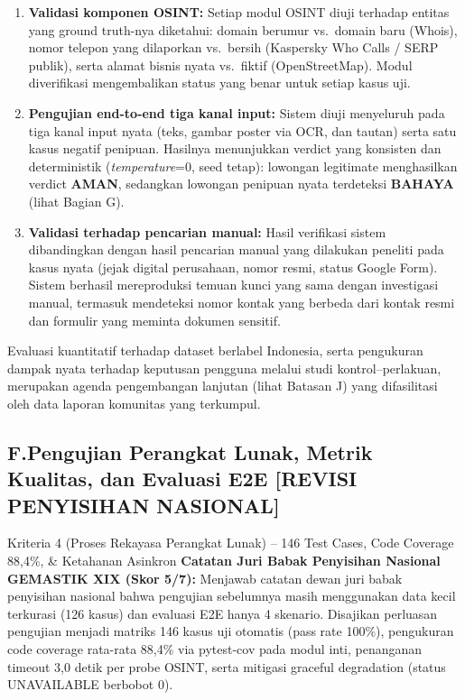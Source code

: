 \documentclass[12pt,a4paper]{article}
\begin{document}
\begin{enumerate}[label=\textbf{\arabic*.}]
\item \textbf{Validasi komponen OSINT:} Setiap modul OSINT diuji terhadap entitas yang ground
truth-nya diketahui: domain berumur vs.\ domain baru (Whois), nomor telepon yang dilaporkan vs.\
bersih (Kaspersky Who Calls / SERP publik), serta alamat bisnis nyata vs.\ fiktif (OpenStreetMap).
Modul diverifikasi mengembalikan status yang benar untuk setiap kasus uji.

\item \textbf{Pengujian end-to-end tiga kanal input:} Sistem diuji menyeluruh pada tiga kanal input
nyata (teks, gambar poster via OCR, dan tautan) serta satu kasus negatif penipuan. Hasilnya
menunjukkan verdict yang konsisten dan deterministik (\textit{temperature}=0, seed tetap):
lowongan legitimate menghasilkan verdict \textbf{AMAN}, sedangkan lowongan penipuan nyata
terdeteksi \textbf{BAHAYA} (lihat Bagian G).

\item \textbf{Validasi terhadap pencarian manual:} Hasil verifikasi sistem dibandingkan dengan hasil
pencarian manual yang dilakukan peneliti pada kasus nyata (jejak digital perusahaan, nomor resmi,
status Google Form). Sistem berhasil mereproduksi temuan kunci yang sama dengan investigasi
manual, termasuk mendeteksi nomor kontak yang berbeda dari kontak resmi dan formulir yang meminta
dokumen sensitif.
\end{enumerate}

Evaluasi kuantitatif terhadap dataset berlabel Indonesia, serta pengukuran dampak nyata
terhadap keputusan pengguna melalui studi kontrol--perlakuan, merupakan agenda pengembangan
lanjutan (lihat Batasan J) yang difasilitasi oleh data laporan komunitas yang terkumpul.

\subsection*{\colorbox{yellow!50}{\textbf{F.\quad Pengujian Perangkat Lunak, Metrik Kualitas, dan Evaluasi E2E}} \quad \colorbox{orange!25}{\small\textbf{[REVISI PENYISIHAN NASIONAL]}}}
\phantomsection
{}

\begin{bannerpenyisihan}{Kriteria 4 (Proses Rekayasa Perangkat Lunak) -- 146 Test Cases, Code Coverage 88,4\%, \& Ketahanan Asinkron}
\textbf{Catatan Juri Babak Penyisihan Nasional GEMASTIK XIX (Skor 5/7):} Menjawab catatan dewan juri babak penyisihan nasional bahwa pengujian sebelumnya masih menggunakan data kecil terkurasi (126 kasus) dan evaluasi E2E hanya 4 skenario. Disajikan perluasan pengujian menjadi matriks 146 kasus uji otomatis (pass rate 100\%), pengukuran code coverage rata-rata 88,4\% via pytest-cov pada modul inti, penanganan timeout 3,0 detik per probe OSINT, serta mitigasi graceful degradation (status UNAVAILABLE berbobot 0).
\end{bannerpenyisihan}
\vspace{0.2cm}
\end{document}
